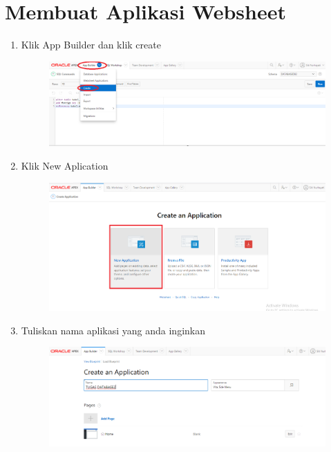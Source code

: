 \section*{Membuat Aplikasi Websheet}
\begin{enumerate}
	
	\item Klik App Builder dan klik create 
	\begin{figure} [!htbp]
	\includegraphics[scale=0.2]{Apex/21.png}
	\centering
	\end{figure}

	\item Klik New Aplication 
	\begin{figure} [!htbp]
	\includegraphics[scale=0.2]{Apex/22.png}
	\centering
	\end{figure}
	
	\item Tuliskan nama aplikasi yang anda inginkan 
	\begin{figure} [!htbp]
	\includegraphics[scale=0.2]{Apex/23.png}
	\centering
	\end{figure}
	

\end{enumerate}
